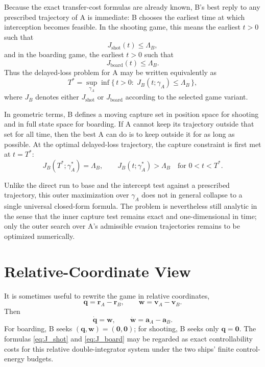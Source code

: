 \documentclass[journal, a4paper]{IEEEtran}
\begin{document}
Because the exact transfer-cost formulas are already known, B's best reply to any prescribed trajectory of A is immediate: B chooses the earliest time at which interception becomes feasible. In the shooting game, this means the earliest $t>0$ such that
\begin{equation}
J_{\mathrm{shot}}(t)\le \Lambda_B,
\end{equation}
and in the boarding game, the earliest $t>0$ such that
\begin{equation}
J_{\mathrm{board}}(t)\le \Lambda_B.
\end{equation}
Thus the delayed-loss problem for A may be written equivalently as
\begin{equation}
T^* = \sup_{\gamma_A}\inf\{\,t>0:\;J_B(t;\gamma_A)\le \Lambda_B\,\},
\label{eq:delay_reduced}
\end{equation}
where $J_B$ denotes either $J_{\mathrm{shot}}$ or $J_{\mathrm{board}}$ according to the selected game variant.

In geometric terms, B defines a moving capture set in position space for shooting and in full state space for boarding. If A cannot keep its trajectory outside that set for all time, then the best A can do is to keep outside it for as long as possible. At the optimal delayed-loss trajectory, the capture constraint is first met at $t=T^*$:
\begin{equation}
J_B(T^*;\gamma_A^*)=\Lambda_B,
\qquad
J_B(t;\gamma_A^*)>\Lambda_B
\quad\text{for }0<t<T^*.
\end{equation}

Unlike the direct run to base and the intercept test against a prescribed trajectory, this outer maximization over $\gamma_A$ does not in general collapse to a single universal closed-form formula. The problem is nevertheless still analytic in the sense that the inner capture test remains exact and one-dimensional in time; only the outer search over A's admissible evasion trajectories remains to be optimized numerically.

\section{Relative-Coordinate View}
It is sometimes useful to rewrite the game in relative coordinates,
\begin{equation}
\mathbf q = \mathbf r_A-\mathbf r_B,
\qquad
\mathbf w = \mathbf v_A-\mathbf v_B.
\end{equation}
Then
\begin{equation}
\dot{\mathbf q}=\mathbf w,
\qquad
\dot{\mathbf w}=\mathbf a_A-\mathbf a_B.
\end{equation}
For boarding, B seeks $(\mathbf q,\mathbf w)=(\mathbf 0,\mathbf 0)$; for shooting, B seeks only $\mathbf q=\mathbf 0$. The formulas \eqref{eq:J_shot} and \eqref{eq:J_board} may be regarded as exact controllability costs for this relative double-integrator system under the two ships' finite control-energy budgets.
\end{document}
